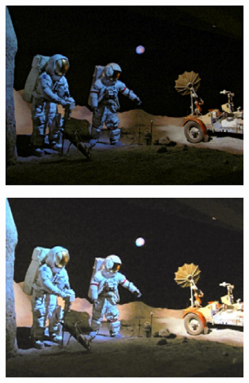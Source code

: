 \documentclass[letterpaper,10pt]{article}
\begin{document}
\begin{figure}[htbp]
\begin{subfigure}{0.24\textwidth}
					\captionsetup{font=scriptsize}
					\label{fig: LLME1}
				\end{subfigure}
				\begin{subfigure}{0.24\textwidth}
					\includegraphics[width=\linewidth]{picture/LLIE/SRIE1}
					\captionsetup{font=scriptsize}
					\label{fig: SRIE1}	
				\end{subfigure}
				\begin{subfigure}{0.24\textwidth}
					\includegraphics[width=\linewidth]{picture/LLIE/Our1}
					\captionsetup{font=scriptsize}
					\label{fig: Our1}	
				\end{subfigure} \\
				

\end{figure}
\end{document}

